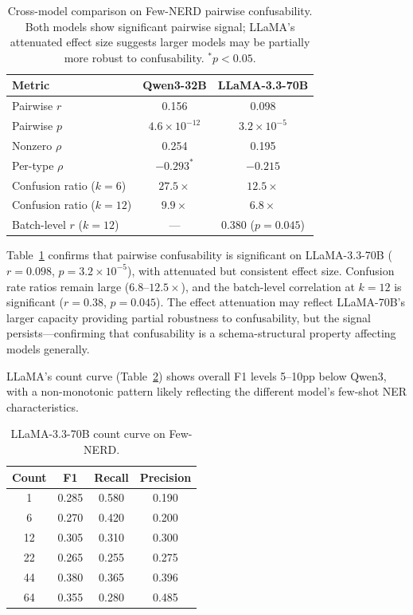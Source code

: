 \documentclass[11pt,a4paper]{article}
\begin{document}
\begin{table}[t]
\centering
\small
\begin{tabular}{lcc}
\toprule
\textbf{Metric} & \textbf{Qwen3-32B} & \textbf{LLaMA-3.3-70B} \\
\midrule
Pairwise $r$ & 0.156 & 0.098 \\
Pairwise $p$ & $4.6 \times 10^{-12}$ & $3.2 \times 10^{-5}$ \\
Nonzero $\rho$ & 0.254 & 0.195 \\
Per-type $\rho$ & $-0.293^{*}$ & $-0.215$ \\
Confusion ratio ($k{=}6$) & $27.5\times$ & $12.5\times$ \\
Confusion ratio ($k{=}12$) & $9.9\times$ & $6.8\times$ \\
\midrule
Batch-level $r$ ($k{=}12$) & --- & 0.380 ($p{=}0.045$) \\
\bottomrule
\end{tabular}
\caption{Cross-model comparison on Few-NERD pairwise confusability. Both models show significant pairwise signal; LLaMA's attenuated effect size suggests larger models may be partially more robust to confusability. $^{*}p{<}0.05$.}
\label{tab:cross-model}
\end{table}

Table~\ref{tab:cross-model} confirms that pairwise confusability is significant on LLaMA-3.3-70B ($r{=}0.098$, $p{=}3.2 \times 10^{-5}$), with attenuated but consistent effect size.
Confusion rate ratios remain large ($6.8$--$12.5\times$), and the batch-level correlation at $k{=}12$ is significant ($r{=}0.38$, $p{=}0.045$).
The effect attenuation may reflect LLaMA-70B's larger capacity providing partial robustness to confusability, but the signal persists---confirming that confusability is a schema-structural property affecting models generally.

LLaMA's count curve (Table~\ref{tab:llama-count}) shows overall F1 levels 5--10pp below Qwen3, with a non-monotonic pattern likely reflecting the different model's few-shot NER characteristics.

\begin{table}[t]
\centering
\small
\begin{tabular}{cccc}
\toprule
\textbf{Count} & \textbf{F1} & \textbf{Recall} & \textbf{Precision} \\
\midrule
1  & 0.285 & 0.580 & 0.190 \\
6  & 0.270 & 0.420 & 0.200 \\
12 & 0.305 & 0.310 & 0.300 \\
22 & 0.265 & 0.255 & 0.275 \\
44 & 0.380 & 0.365 & 0.396 \\
64 & 0.355 & 0.280 & 0.485 \\
\bottomrule
\end{tabular}
\caption{LLaMA-3.3-70B count curve on Few-NERD.}
\label{tab:llama-count}
\end{table}
\end{document}
